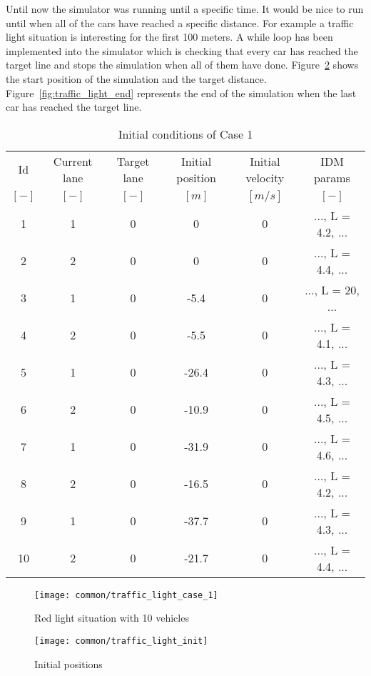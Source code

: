 		Until now the simulator was running until a specific time. It would be nice to run until when all of the cars have reached a specific distance. For example a traffic light situation is interesting for the first 100 meters. A while loop has been implemented into the simulator which is checking that every car has reached the target line and stops the simulation when all of them have done. Figure~\ref{fig:traffic_light_init} shows the start position of the simulation and the target distance. Figure~\ref{fig:traffic_light_end} represents the end of the simulation when the last car has reached the target line.
		\begin{table}
			\begin{center}
				\begin{tabular}{ |c|c|c|c|c|c| }
					\hline
					Id & Current lane & Target lane & Initial position & Initial velocity& IDM params\\
					$[-]$ & $[-]$ & $[-]$ & $[m]$ & $[m/s]$ & $[-]$\\
					\hline
					1 & 1 & 0 & 0 & 0 & ..., L = 4.2, ... \\
					2 & 2 & 0 & 0 & 0 & ..., L = 4.4, ... \\
					3 & 1 & 0 & -5.4 & 0 & ..., L = 20, ... \\
					4 & 2 & 0 & -5.5 & 0 & ..., L = 4.1, ... \\
					5 & 1 & 0 & -26.4 & 0 & ..., L = 4.3, ... \\
					6 & 2 & 0 & -10.9 & 0 & ..., L = 4.5, ... \\
					7 & 1 & 0 & -31.9 & 0 & ..., L = 4.6, ... \\
					8 & 2 & 0 & -16.5 & 0 & ..., L = 4.2, ... \\
					9 & 1 & 0 & -37.7 & 0 & ..., L = 4.3, ... \\
					10 & 2 & 0 & -21.7 & 0 & ..., L = 4.4, ... \\
					\hline
				\end{tabular}
			\end{center}
			\caption{Initial conditions of Case 1}
			\label{tab:case_1_definition_array}
		\end{table}
		\begin{figure}
			\centering
			\texttt{[image: common/traffic\_light\_case\_1]}
			\caption{Red light situation with 10 vehicles}
			\label{fig:red_light_situation}
		\end{figure}
		\begin{figure}
			\centering
			\texttt{[image: common/traffic\_light\_init]}
			\caption{Initial positions}
			\label{fig:traffic_light_init}
		\end{figure}
